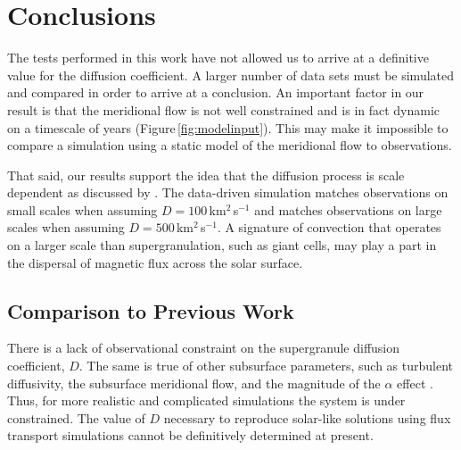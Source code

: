 
\section{Conclusions}\label{sect:conc}

The tests performed in this work have not allowed us to arrive at a definitive value for the diffusion coefficient. A larger number of data sets must be simulated and compared in order to arrive at a conclusion. An important factor in our result is that the meridional flow is not well constrained and is in fact dynamic on a timescale of years (Figure\,\ref{fig:modelinput}). This may make it impossible to compare a simulation using a static model of the meridional flow to observations.

That said, our results support the idea that the diffusion process is scale dependent as discussed by \cite{Hagenaar:1999}. The data-driven simulation matches observations on small scales when assuming $D=100$\,km$^2$\,s$^{-1}$ and matches observations on large scales when assuming $D=500$\,km$^2$\,s$^{-1}$. A signature of convection that operates on a larger scale than supergranulation, such as giant cells, may play a part in the dispersal of magnetic flux across the solar surface.



\subsection{Comparison to Previous Work}

There is a lack of observational constraint on the supergranule diffusion coefficient, $D$. The same is true of other subsurface parameters, such as turbulent diffusivity, the subsurface meridional flow, and the magnitude of the $\alpha$ effect \cite{Dikpati:2002,Dikpati:2004}. Thus, for more realistic and complicated simulations the system is under constrained. The value of $D$ necessary to reproduce solar-like solutions using flux transport simulations cannot be definitively determined at present.

